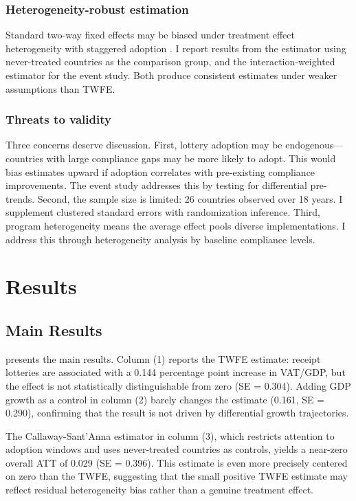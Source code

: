 \documentclass[12pt]{article}
\begin{document}
\subsubsection*{Heterogeneity-robust estimation} Standard two-way fixed effects may be biased under treatment effect heterogeneity with staggered adoption \citep{GoodmanBacon2021}. I report results from the \citet{CallawayandSantAnna2021} estimator using never-treated countries as the comparison group, and the \citet{SunandAbraham2021} interaction-weighted estimator for the event study. Both produce consistent estimates under weaker assumptions than TWFE.

\subsubsection*{Threats to validity} Three concerns deserve discussion. First, lottery adoption may be endogenous---countries with large compliance gaps may be more likely to adopt. This would bias estimates upward if adoption correlates with pre-existing compliance improvements. The event study addresses this by testing for differential pre-trends. Second, the sample size is limited: 26 countries observed over 18 years. I supplement clustered standard errors with randomization inference. Third, program heterogeneity means the average effect pools diverse implementations. I address this through heterogeneity analysis by baseline compliance levels.


\section{Results}

\subsection{Main Results}



 presents the main results. Column (1) reports the TWFE estimate: receipt lotteries are associated with a 0.144 percentage point increase in VAT/GDP, but the effect is not statistically distinguishable from zero (SE = 0.304). Adding GDP growth as a control in column (2) barely changes the estimate (0.161, SE = 0.290), confirming that the result is not driven by differential growth trajectories.

The Callaway-Sant'Anna estimator in column (3), which restricts attention to adoption windows and uses never-treated countries as controls, yields a near-zero overall ATT of 0.029 (SE = 0.396). This estimate is even more precisely centered on zero than the TWFE, suggesting that the small positive TWFE estimate may reflect residual heterogeneity bias rather than a genuine treatment effect.
\end{document}
